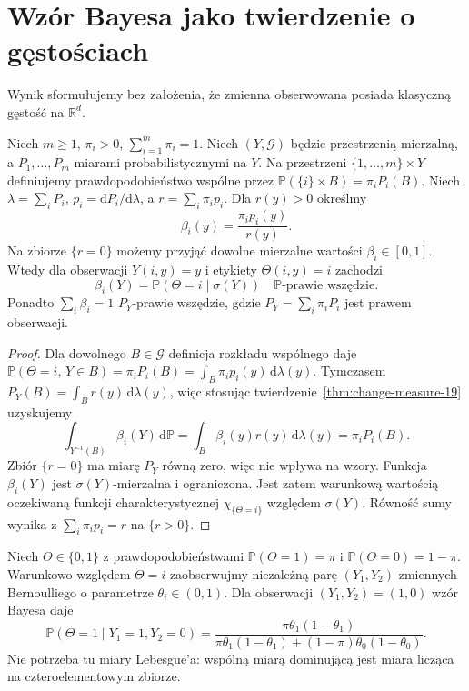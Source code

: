 \section{Wzór Bayesa jako twierdzenie o gęstościach}
Wynik sformułujemy bez założenia, że zmienna obserwowana
posiada klasyczną gęstość na $\mathbb R^d$.

\begin{twierdzenie}
\label{thm:bayes-finite-19}
Niech $m\ge1$, $\pi_i>0$, $\sum_{i=1}^m\pi_i=1$.
Niech $(Y,\mathcal G)$ będzie przestrzenią mierzalną,
a $P_1,\ldots,P_m$ miarami probabilistycznymi na $Y$.
Na przestrzeni $\{1,\ldots,m\}\times Y$ definiujemy
prawdopodobieństwo wspólne przez
$\mathbb P(\{i\}\times B)=\pi_iP_i(B)$.
Niech $\lambda=\sum_iP_i$, $p_i=\mathrm dP_i/\mathrm d\lambda$,
a $r=\sum_i\pi_i p_i$. Dla $r(y)>0$ określmy
\[
 \beta_i(y)=\frac{\pi_i p_i(y)}{r(y)}.
\]
Na zbiorze $\{r=0\}$ możemy przyjąć dowolne mierzalne
wartości $\beta_i\in[0,1]$. Wtedy dla obserwacji
$Y(i,y)=y$ i etykiety $\Theta(i,y)=i$ zachodzi
\begin{equation}\label{eq:bayes-finite-19}
 \beta_i(Y)=\mathbb P(\Theta=i\mid\sigma(Y))
 \quad\mathbb P\text{-prawie wszędzie}.
\end{equation}
Ponadto $\sum_i\beta_i=1$ $P_Y$-prawie wszędzie,
gdzie $P_Y=\sum_i\pi_iP_i$ jest prawem obserwacji.
\end{twierdzenie}
\begin{proof}
Dla dowolnego $B\in\mathcal G$ definicja rozkładu
wspólnego daje
$\mathbb P(\Theta=i,\,Y\in B)=\pi_iP_i(B)
=\int_B\pi_ip_i(y)\,\mathrm d\lambda(y)$.
Tymczasem $P_Y(B)=\int_Br(y)\,\mathrm d\lambda(y)$,
więc stosując twierdzenie~\ref{thm:change-measure-19}
uzyskujemy
\[
\int_{Y^{-1}(B)}\beta_i(Y)\,\mathrm d\mathbb P
=\int_B\beta_i(y)r(y)\,\mathrm d\lambda(y)
=\pi_iP_i(B).
\]
Zbiór $\{r=0\}$ ma miarę $P_Y$ równą zero, więc nie
wpływa na wzory. Funkcja $\beta_i(Y)$ jest
$\sigma(Y)$-mierzalna i ograniczona. Jest zatem
warunkową wartością oczekiwaną funkcji charakterystycznej
$\chi_{\{\Theta=i\}}$ względem $\sigma(Y)$.
Równość sumy wynika z $\sum_i\pi_ip_i=r$ na $\{r>0\}$.
\end{proof}

\begin{przyklad}
Niech $\Theta\in\{0,1\}$ z prawdopodobieństwami
$\mathbb P(\Theta=1)=\pi$ i $\mathbb P(\Theta=0)=1-\pi$.
Warunkowo względem $\Theta=i$ zaobserwujmy
niezależną parę $(Y_1,Y_2)$ zmiennych Bernoulliego
o parametrze $\theta_i\in(0,1)$. Dla obserwacji
$(Y_1,Y_2)=(1,0)$ wzór Bayesa daje
\[
\mathbb P(\Theta=1\mid Y_1=1,Y_2=0)
=\frac{\pi\theta_1(1-\theta_1)}
{\pi\theta_1(1-\theta_1)+(1-\pi)\theta_0(1-\theta_0)}.
\]
Nie potrzeba tu miary Lebesgue'a: wspólną miarą
dominującą jest miara licząca na czteroelementowym zbiorze.
\end{przyklad}

